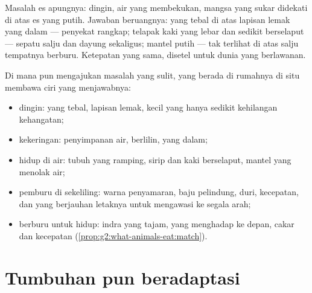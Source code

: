 \begin{example}\label{ex:g4:adapted-to-their-world:bear}
Masalah es apungnya: dingin, air yang membekukan, mangsa yang sukar
didekati di atas es yang putih. Jawaban beruangnya:  yang tebal di
atas lapisan lemak yang dalam --- penyekat rangkap; telapak kaki yang
lebar dan sedikit berselaput --- sepatu salju dan dayung sekaligus;
mantel putih --- tak terlihat di atas salju tempatnya berburu.
Ketepatan yang sama, disetel untuk dunia yang berlawanan.
\end{example}

\begin{proposition}\label{prop:g4:adapted-to-their-world:answers}
Di mana pun  mengajukan masalah yang sulit, 
yang berada di rumahnya di situ membawa ciri yang menjawabnya:
\begin{itemize}
  \item dingin:  yang tebal, lapisan lemak,  kecil yang
        hanya sedikit kehilangan kehangatan;
  \item kekeringan: penyimpanan air,  berlilin,  yang dalam;
  \item hidup di air: tubuh yang ramping, sirip dan kaki berselaput,
        mantel yang menolak air;
  \item pemburu di sekeliling: warna penyamaran, baju pelindung, duri,
        kecepatan, dan  yang berjauhan letaknya untuk mengawasi ke
        segala arah;
  \item berburu untuk hidup: indra yang tajam,  yang menghadap ke
        depan, cakar dan kecepatan
        (\cref{prop:g2:what-animals-eat:match}).
\end{itemize}
\end{proposition}
\admitted

\section{Tumbuhan pun beradaptasi}

